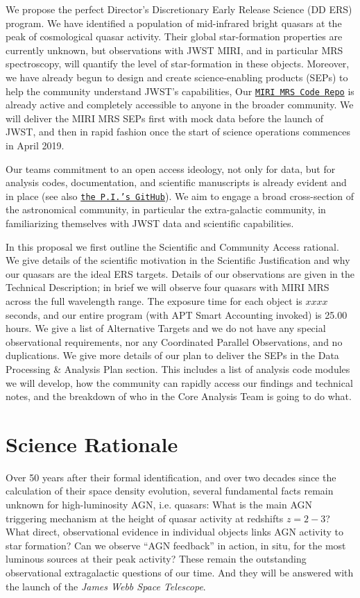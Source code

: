 We propose the perfect Director's Discretionary Early Release Science
(DD ERS) program. We have identified a population of mid-infrared
bright quasars at the peak of cosmological quasar activity. Their
global star-formation properties are currently unknown, but
observations with JWST MIRI, and in particular MRS spectroscopy, will
quantify the level of star-formation in these objects.
Moreover, we have already begun to design and create science-enabling
products (SEPs) to help the community understand JWST's capabilities,
Our \href{https://github.com/miri-mrs}{{\tt MIRI MRS Code Repo}} is
already active and completely accessible to anyone in the broader
community.  We will deliver the MIRI MRS SEPs first with mock data
before the launch of JWST, and then in rapid fashion once the start of
science operations commences in April 2019.

\smallskip \smallskip
\noindent
Our teams commitment to an open access ideology, not only for data,
but for analysis codes, documentation, and scientific manuscripts is
already evident and in place (see also
\href{https://github.com/d80b2t}{{\tt the P.I.'s GitHub}}).  We aim to
engage a broad cross-section of the astronomical community, in
particular the extra-galactic community, in familiarizing themselves
with JWST data and scientific capabilities.

\smallskip \smallskip
\noindent
In this proposal we first outline the Scientific and Community Access
rational.  We give details of the scientific motivation in the
Scientific Justification and why our quasars are the ideal ERS
targets.  Details of our observations are given in the Technical
Description; in brief we will observe four quasars with MIRI MRS
across the full wavelength range. The exposure time for each object is
$xxxx$ seconds, and our entire program (with APT Smart Accounting
invoked) is 25.00 hours.  We give a list of Alternative Targets and we
do not have any special observational requirements, nor any Coordinated
Parallel Observations, and no duplications.  We give more details of
our plan to deliver the SEPs in the Data Processing \& Analysis Plan
section. This includes a list of analysis code modules we will
develop, how the community can rapidly access our findings and
technical notes, and the breakdown of who in the Core Analysis Team is
going to do what.



\section*{Science Rationale}
\noindent
Over 50 years after their formal identification, and over two decades
since the calculation of their space density evolution, several
fundamental facts remain unknown for high-luminosity AGN,
i.e. quasars: What is the main AGN triggering mechanism at the height
of quasar activity at redshifts $z=2-3$? What direct,
observational evidence in individual objects links AGN activity
to star formation?  Can we observe ``AGN feedback'' in action, in situ,  
for the most luminous sources at their peak activity? These remain the
outstanding observational extragalactic questions of our time. And
they will be answered with the launch of the {\it James Webb Space
Telescope}.

